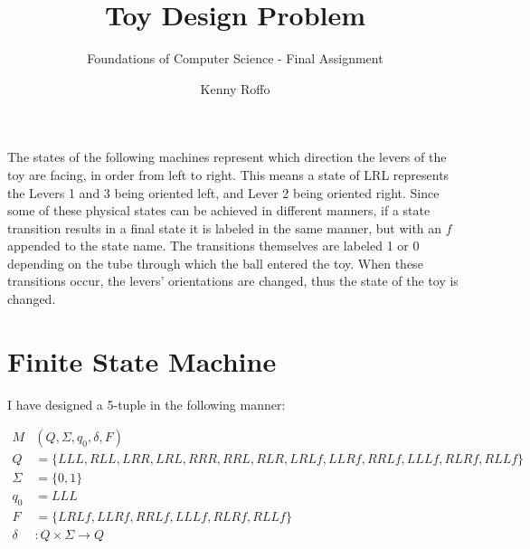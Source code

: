 \documentclass{scrartcl}
\title{Toy Design Problem}
\subtitle{Foundations of Computer Science - Final Assignment}
\author{Kenny Roffo}
\begin{document}
\maketitle

The states of the following machines represent which direction the levers of the
toy are facing, in order from left to right. This means a state of LRL
represents the Levers 1 and 3 being oriented left, and Lever 2 being oriented
right. Since some of these physical states can be achieved in different manners,
if a state transition results in a final state it is labeled in the same manner,
but with an $f$ appended to the state name. The transitions themselves are
labeled 1 or 0 depending on the tube through which the ball entered the toy.
When these transitions occur, the levers' orientations are changed, thus the
state of the toy is changed.

\section{Finite State Machine}
I have designed a 5-tuple in the following manner:

\begin{align*}
M      &(Q,\Sigma,q_0,\delta,F)\\
Q      &= \{LLL,RLL,LRR,LRL,RRR,RRL,RLR,LRLf,LLRf,RRLf,LLLf,RLRf,RLLf\}\\
\Sigma &= \{0,1\}\\
q_0    &= LLL\\
F      &= \{LRLf,LLRf,RRLf,LLLf,RLRf,RLLf\}\\
\delta &: Q \times \Sigma \rightarrow Q
\end{align*}
\end{document}
